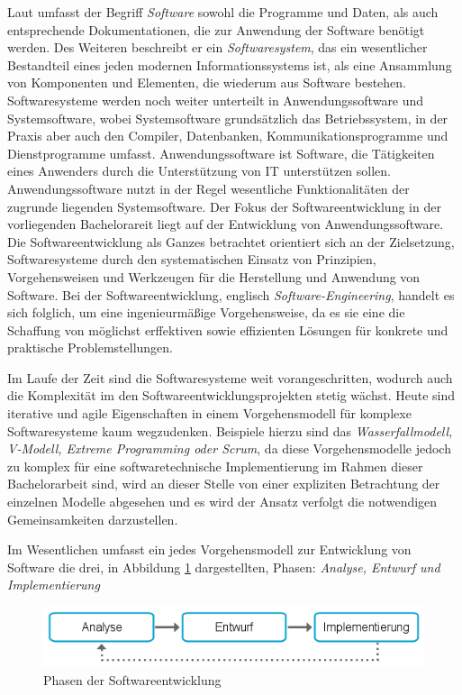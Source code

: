 Laut \citeauthor{Balzert.2009} umfasst der Begriff \textit{Software} sowohl die Programme und Daten, als auch entsprechende Dokumentationen, die zur Anwendung der Software benötigt werden. Des Weiteren beschreibt er ein \textit{Softwaresystem}, das ein wesentlicher Bestandteil eines jeden modernen Informationssystems ist, als eine Ansammlung von Komponenten und Elementen, die wiederum aus Software bestehen. Softwaresysteme werden noch weiter unterteilt in Anwendungssoftware und Systemsoftware, wobei Systemsoftware grundsätzlich das Betriebssystem, in der Praxis aber auch den Compiler, Datenbanken, Kommunikationsprogramme und Dienstprogramme umfasst.
\cite{Balzert.2009}
Anwendungssoftware ist Software, die Tätigkeiten eines Anwenders durch die Unterstützung von \ac{IT} unterstützen sollen. 
Anwendungssoftware nutzt in der Regel wesentliche Funktionalitäten der zugrunde liegenden Systemsoftware. Der Fokus der Softwareentwicklung in der vorliegenden Bachelorareit liegt auf der Entwicklung von Anwendungssoftware. 
\cite{Balzert.2009}
Die Softwareentwicklung als Ganzes betrachtet orientiert sich an der Zielsetzung, Softwaresysteme durch den systematischen Einsatz von Prinzipien, Vorgehensweisen und Werkzeugen für die Herstellung und Anwendung von Software.
\cite{Balzert.2009}
Bei der Softwareentwicklung, englisch \textit{Software-Engineering}, handelt es sich folglich, um eine ingenieurmäßige Vorgehensweise, da es sie eine die Schaffung von möglichst erffektiven sowie effizienten Lösungen für konkrete und praktische Problemstellungen.
\cite{Balzert.2009}

Im Laufe der Zeit sind die Softwaresysteme weit vorangeschritten, wodurch auch die Komplexität im den Softwareentwicklungsprojekten stetig wächst. Heute sind iterative und agile Eigenschaften in einem Vorgehensmodell für komplexe Softwaresysteme kaum wegzudenken. Beispiele hierzu sind das \textit{Wasserfallmodell, V-Modell, Extreme Programming oder Scrum}, da diese Vorgehensmodelle jedoch zu komplex für eine softwaretechnische Implementierung im Rahmen dieser Bachelorarbeit sind, wird an dieser Stelle von einer expliziten Betrachtung der einzelnen Modelle abgesehen und es wird der Ansatz verfolgt die notwendigen Gemeinsamkeiten darzustellen.
\cite{Krypczyk.2018}

Im Wesentlichen umfasst ein jedes Vorgehensmodell zur Entwicklung von Software die drei, in Abbildung \ref{fig:Phasen der Softwareentwicklung} dargestellten, Phasen: \textit{Analyse, Entwurf und Implementierung}

\begin{figure}[H]
	\centering 
    \includegraphics[width=\textwidth]{img/entwicklung.png}	
    \caption[Phasen der Softwareentwicklung]
    {Phasen der Softwareentwicklung\protect\footnotemark}
    \label{fig:Phasen der Softwareentwicklung}
\end{figure}

